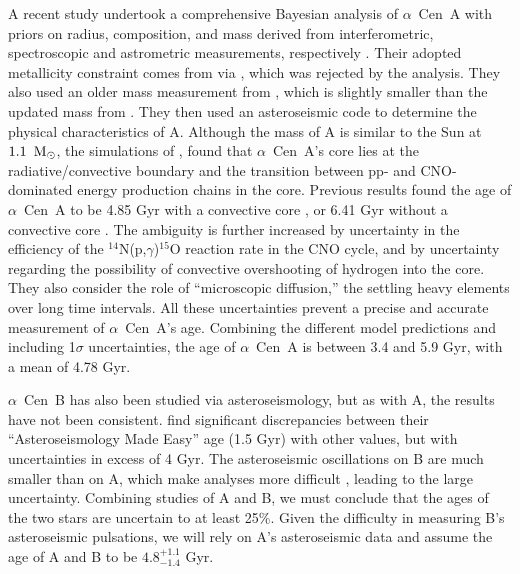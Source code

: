 \documentclass[preprint,12pt]{aastex}
\def\msun{{\rm\,M_\odot}}
\def\eg{{\it e.g.\ }}
\def\acen{{$\alpha$~Cen}}
\begin{document}
A recent study undertook a comprehensive Bayesian analysis of \acen~A
with priors on radius, composition, and mass derived from
interferometric, spectroscopic and astrometric measurements,
respectively \citep{Bazot16}. Their adopted metallicity constraint
comes from \cite{NeuforgeMagain97} via \cite{Thoul03}, which was
rejected by the \cite{HinkelKane13} analysis. They also used an older
mass measurement from \cite{Pourbaix02}, which is slightly smaller
than the updated mass from \cite{PourbaixBoffin16}. They then used an
asteroseismic code to determine the physical characteristics of
A. Although the mass of A is similar to the Sun at $1.1~\msun$, the
simulations of \cite{Bazot16}, found that \acen~A's core lies at the
radiative/convective boundary and the transition between pp- and
CNO-dominated energy production chains in the core. Previous results
found the age of \acen~A to be 4.85 Gyr with a convective core
\citep{Thevenin02}, or 6.41 Gyr without a convective core
\citep{Thoul03}. The ambiguity is further increased by uncertainty in
the efficiency of the $^{14}$N(p,$\gamma$)$^{15}$O reaction rate in
the CNO cycle, and by uncertainty regarding the possibility of
convective overshooting of hydrogen into the core. They also consider
the role of ``microscopic diffusion,'' the settling heavy
elements over long time intervals. All these uncertainties
prevent a precise and accurate measurement of \acen~A's
age. Combining the different model predictions and including 1$\sigma$
uncertainties, the age of \acen~A is between 3.4 and 5.9 Gyr,
with a mean of 4.78 Gyr.

\acen~B has also been studied via asteroseismology, but as with A, the
results have not been consistent. \cite{Lundkvist14} find significant
discrepancies between their ``Asteroseismology Made Easy'' age (1.5
Gyr) with other values, but with uncertainties in excess of 4 Gyr. The
asteroseismic oscillations on B are much smaller than on A, which make
analyses more difficult \citep[see, \eg,][]{CarrierBourban03},
leading to the large uncertainty. Combining studies of A and B, we
must conclude that the ages of the two stars are uncertain to at least
25\%. Given the difficulty in measuring B's asteroseismic pulsations,
we will rely on A's asteroseismic data and assume the age of A and B
to be $4.8^{+1.1}_{-1.4}$ Gyr.
\end{document}
